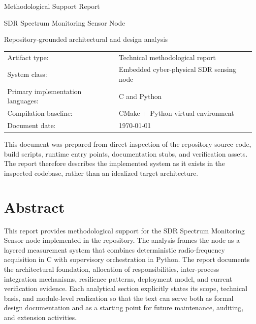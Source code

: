 \documentclass[11pt,a4paper]{report}
\begin{document}
\hypersetup{pageanchor=false}
\begin{titlepage}
\centering
{\Large Methodological Support Report\par}
\vspace{0.7cm}
{\huge SDR Spectrum Monitoring Sensor Node\par}
\vspace{1.0cm}
{\large Repository-grounded architectural and design analysis\par}
\vfill
\begin{tabular}{ll}
Artifact type: & Technical methodological report \\
System class: & Embedded cyber-physical SDR sensing node \\
Primary implementation languages: & C and Python \\
Compilation baseline: & CMake + Python virtual environment \\
Document date: & \today \\
\end{tabular}
\vfill
\begin{minipage}{0.88\textwidth}
\small
This document was prepared from direct inspection of the repository source code, build scripts,
runtime entry points, documentation stubs, and verification assets. The report therefore describes
the implemented system as it exists in the inspected codebase, rather than an idealized target
architecture.
\end{minipage}
\end{titlepage}
\hypersetup{pageanchor=true}


\chapter*{Abstract}
This report provides methodological support for the SDR Spectrum Monitoring Sensor node implemented
in the repository. The analysis frames the node as a layered measurement system that combines
deterministic radio-frequency acquisition in C with supervisory orchestration in Python. The report
documents the architectural foundation, allocation of responsibilities, inter-process integration
mechanisms, resilience patterns, deployment model, and current verification evidence. Each analytical
section explicitly states its scope, technical basis, and module-level realization so that the text
can serve both as formal design documentation and as a starting point for future maintenance,
auditing, and extension activities.
\end{document}
